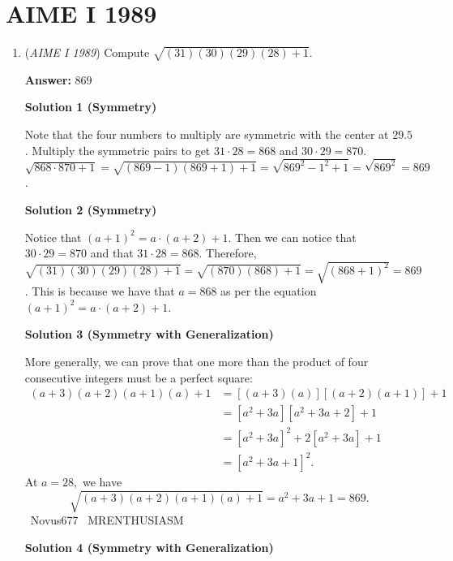 \section{AIME I 1989}
        \begin{enumerate}
        	\item (\textit{AIME I 1989}) Compute $\sqrt{(31)(30)(29)(28)+1}$.


 
 \textbf{Answer: }869



\textbf{Solution 1 (Symmetry)}

Note that the four numbers to multiply are symmetric with the center at $29.5$. Multiply the symmetric pairs to get $31\cdot 28=868$ and $30\cdot 29=870$.$\sqrt{868\cdot 870 + 1} = \sqrt{(869-1)(869+1) + 1} = \sqrt{869^2 - 1^2 + 1} = \sqrt{869^2} = \boxed{869}$.

 



\textbf{Solution 2 (Symmetry)}

Notice that $(a+1)^2 = a \cdot (a+2) +1$. Then we can notice that $30 \cdot 29 =870$ and that $31 \cdot 28 = 868$. Therefore, $\sqrt{(31)(30)(29)(28) +1} = \sqrt{(870)(868) +1} = \sqrt{(868 +1)^2} = \boxed{869}$. This is because we have that $a=868$ as per the equation $(a+1)^2 = a \cdot (a+2) +1$.

 



\textbf{Solution 3 (Symmetry with Generalization)}

More generally, we can prove that one more than the product of four consecutive integers must be a perfect square:
 \begin{align*} (a+3)(a+2)(a+1)(a)+1 &= [(a+3)(a)][(a+2)(a+1)]+1 \\ &= [a^2+3a][a^2+3a+2]+1 \\ &= [a^2+3a]^2+2[a^2+3a]+1 \\ &= [a^2+3a+1]^2. \end{align*}
At $a=28,$ we have 
 \[\sqrt{(a+3)(a+2)(a+1)(a)+1}=a^2+3a+1=\boxed{869}.\]~Novus677 ~MRENTHUSIASM

 



\textbf{Solution 4 (Symmetry with Generalization)}


\end{enumerate}
